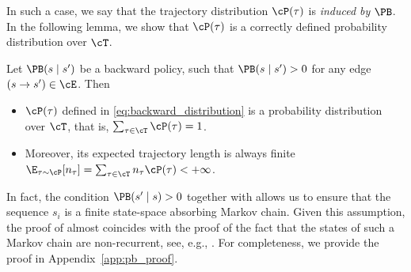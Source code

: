 In such a case, we say that the trajectory distribution $\cP(\tau)$ is \textit{induced by $\PB$}. In the following lemma, we show that $\cP(\tau)$ is a correctly defined probability distribution over $\cT$. 

\begin{lemma}
\label{th:fixed_pb}
Let $\PB(s \mid s')$ be a backward policy, such that $\PB(s \mid s') > 0$ for any edge $(s \to s') \in \cE$. Then
\begin{itemize}[noitemsep, nolistsep]
    \item $\cP(\tau)$ defined in \eqref{eq:backward_distribution} is a probability distribution over $\cT$, that is, $\sum_{\tau \in \cT} \cP(\tau) = 1$.
    \item Moreover, its expected trajectory length is always finite $\E_{\bf{\tau} \sim \cP}[n_{\bf{\tau}}] = \sum_{\tau \in \cT} n_{\tau} \cP(\tau) < +\infty$.
\end{itemize}
\end{lemma}
In fact, the condition $\PB(s' \mid s) > 0$  together with  allows us to ensure that the sequence $s_i$ is a finite state-space absorbing Markov chain. Given this assumption, the proof of  almost coincides with the proof of the fact that the states of such a Markov chain are non-recurrent, see, e.g., \cite{levin2017markov}. For completeness, we provide the proof in Appendix~\ref{app:pb_proof}.

